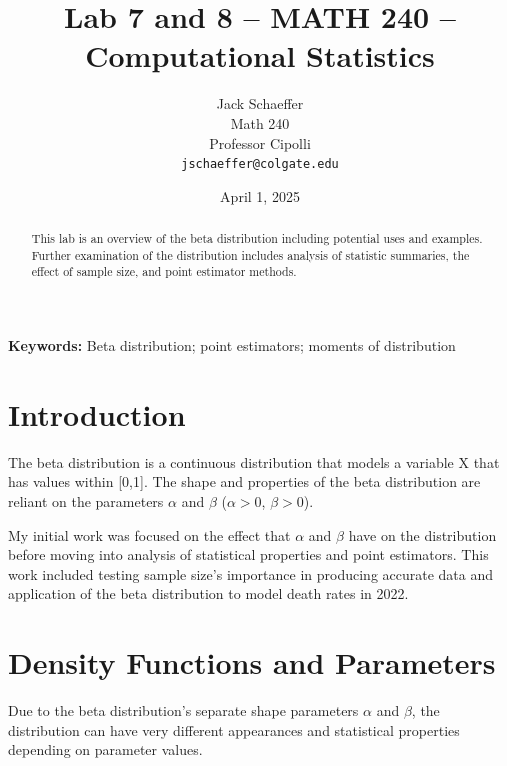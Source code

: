 \documentclass{article}\usepackage[]{graphicx}\usepackage[]{xcolor}
\begin{document}
\vspace{-1in}
\title{Lab 7 and 8 -- MATH 240 -- Computational Statistics}

\author{
  Jack Schaeffer \\
  Math 240  \\
  Professor Cipolli  \\
  {\tt jschaeffer@colgate.edu}
}

\date{April 1, 2025}

\maketitle

\begin{multicols}{2}
\begin{abstract}
This lab is an overview of the beta distribution including potential uses and examples. Further examination of the distribution includes analysis of statistic summaries, the effect of sample size, and point estimator methods.
\end{abstract}

\noindent \textbf{Keywords:} Beta distribution; point estimators; moments of distribution

\section{Introduction}

The beta distribution is a continuous distribution that models a variable X that has values within [0,1]. The shape and properties of the beta distribution are reliant on the parameters $\alpha$ and $\beta$ ($\alpha>0$, $\beta>0$).

My initial work was focused on the effect that $\alpha$ and $\beta$ have on the distribution before moving into analysis of statistical properties and point estimators. This work included testing sample size's importance in producing accurate data and application of the beta distribution to model death rates in 2022.

\section{Density Functions and Parameters}

Due to the beta distribution's separate shape parameters $\alpha$ and $\beta$, the distribution can have very different appearances and statistical properties depending on parameter values.






\end{multicols}
\end{document}
